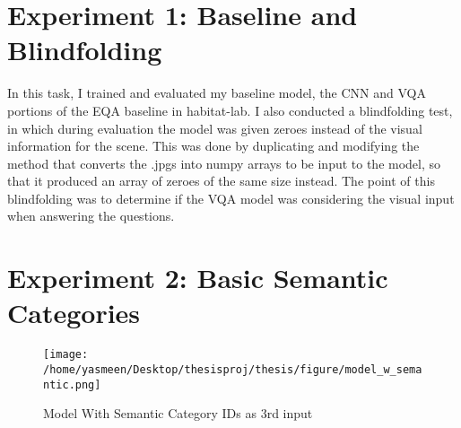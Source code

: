 \section{Experiment 1: Baseline and Blindfolding}
In this task, I trained and evaluated my baseline model, the CNN and VQA portions of the EQA baseline in habitat-lab. I also conducted a blindfolding test, in which during evaluation the model was given zeroes instead of the visual information for the scene. This was done by duplicating and modifying the method that converts the .jpgs into numpy arrays to be input to the model, so that it produced an array of zeroes of the same size instead. The point of this blindfolding was to determine if the VQA model was considering the visual input when answering the questions.

\section{Experiment 2: Basic Semantic Categories}
\begin{figure}[h]
     \centering
     \texttt{[image: /home/yasmeen/Desktop/thesisproj/thesis/figure/model\_w\_semantic.png]}
     \caption{Model With Semantic Category IDs as 3rd input}
     \label{fig:category_model}
\end{figure}

